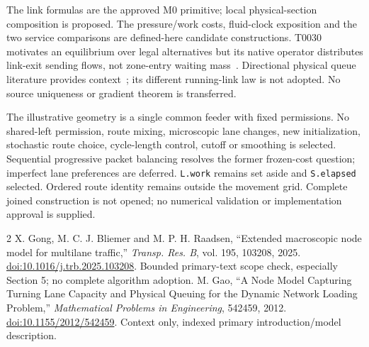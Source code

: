 \documentclass[11pt]{article}
\begin{document}
The link formulas are the approved M0 primitive; local physical-section composition is proposed. The pressure/work costs, fluid-clock exposition and the two service comparisons are defined-here candidate constructions. T0030 motivates an equilibrium over legal alternatives but its native operator distributes link-exit sending flows, not zone-entry waiting mass~\cite{gong}. Directional physical queue literature provides context~\cite{gao}; its different running-link law is not adopted. No source uniqueness or gradient theorem is transferred.

The illustrative geometry is a single common feeder with fixed permissions. No shared-left permission, route mixing, microscopic lane changes, new initialization, stochastic route choice, cycle-length control, cutoff or smoothing is selected. Sequential progressive packet balancing resolves the former frozen-cost question; imperfect lane preferences are deferred. \texttt{L.work} remains set aside and \texttt{S.elapsed} selected. Ordered route identity remains outside the movement grid. Complete joined construction is not opened; no numerical validation or implementation approval is supplied.

\begin{thebibliography}{2}
 X. Gong, M. C. J. Bliemer and M. P. H. Raadsen, ``Extended macroscopic node model for multilane traffic,'' \emph{Transp. Res. B}, vol. 195, 103208, 2025. \href{https://doi.org/10.1016/j.trb.2025.103208}{doi:10.1016/j.trb.2025.103208}. Bounded primary-text scope check, especially Section 5; no complete algorithm adoption.
 M. Gao, ``A Node Model Capturing Turning Lane Capacity and Physical Queuing for the Dynamic Network Loading Problem,'' \emph{Mathematical Problems in Engineering}, 542459, 2012. \href{https://doi.org/10.1155/2012/542459}{doi:10.1155/2012/542459}. Context only, indexed primary introduction/model description.
\end{thebibliography}
\end{document}
